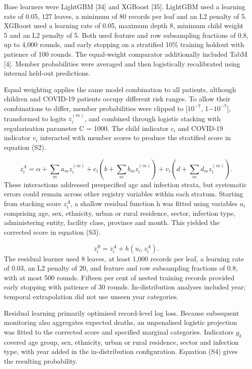 \documentclass[11pt,a4paper]{article}
\newcommand{\subheading}[1]{\par\needspace{3\baselineskip}\vspace{5pt}{\bfseries #1}\par\vspace{1pt}}
\begin{document}
\subheading{S1.4 Stratified calibration and nested fitting}
Base learners were LightGBM [34] and XGBoost [35]. LightGBM used a learning rate of 0.05, 127 leaves, a minimum of 80 records per leaf and an L2 penalty of 5. XGBoost used a learning rate of 0.05, maximum depth 8, minimum child weight 5 and an L2 penalty of 5. Both used feature and row subsampling fractions of 0.8, up to 4,000 rounds, and early stopping on a stratified 10\% training holdout with patience of 100 rounds. The equal-weight comparator additionally included TabM [4]. Member probabilities were averaged and then logistically recalibrated using internal held-out predictions.

Equal weighting applies the same model combination to all patients, although children and COVID-19 patients occupy different risk ranges. To allow their combinations to differ, member probabilities were clipped to [$10^{-7}$, 1$-$$10^{-7}$], transformed to logits $z_i^{(m)}$, and combined through logistic stacking with regularisation parameter C = 1000. The child indicator $c_i$ and COVID-19 indicator $v_i$ interacted with member scores to produce the stratified score in equation (S2).

\begin{equation}
z_i^A=\alpha+\sum_m a_mz_i^{(m)}+c_i\left(b+\sum_m b_mz_i^{(m)}\right)+v_i\left(d+\sum_m d_mz_i^{(m)}\right).
\end{equation}
These interactions addressed prespecified age and infection strata, but systematic errors could remain across other registry variables within each stratum. Starting from stacking score $z_i^A$, a shallow residual function h was fitted using variables $u_i$ comprising age, sex, ethnicity, urban or rural residence, sector, infection type, administering entity, facility class, province and month. This yielded the corrected score in equation (S3).

\begin{equation}
z_i^B=z_i^A+h(u_i,z_i^A).
\end{equation}
The residual learner used 8 leaves, at least 1,000 records per leaf, a learning rate of 0.03, an L2 penalty of 20, and feature and row subsampling fractions of 0.8, with at most 500 rounds. Fifteen per cent of nested training records provided early stopping with patience of 30 rounds. In-distribution analyses included year; temporal extrapolation did not use unseen year categories.

Residual learning primarily optimised record-level log loss. Because subsequent monitoring also aggregates expected deaths, an unpenalised logistic projection was fitted to the corrected score and specified marginal categories. Indicators $g_k$ covered age group, sex, ethnicity, urban or rural residence, sector and infection type, with year added in the in-distribution configuration. Equation (S4) gives the resulting probability.
\end{document}
